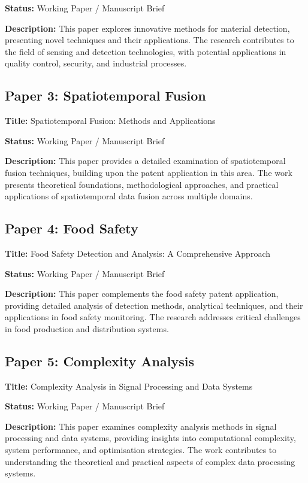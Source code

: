 \documentclass[12pt,a4paper]{article}
\begin{document}
\textbf{Status:} Working Paper / Manuscript Brief

\textbf{Description:} This paper explores innovative methods for material detection, presenting novel techniques and their applications. The research contributes to the field of sensing and detection technologies, with potential applications in quality control, security, and industrial processes.

\subsection{Paper 3: Spatiotemporal Fusion}

\textbf{Title:} Spatiotemporal Fusion: Methods and Applications

\textbf{Status:} Working Paper / Manuscript Brief

\textbf{Description:} This paper provides a detailed examination of spatiotemporal fusion techniques, building upon the patent application in this area. The work presents theoretical foundations, methodological approaches, and practical applications of spatiotemporal data fusion across multiple domains.

\subsection{Paper 4: Food Safety}

\textbf{Title:} Food Safety Detection and Analysis: A Comprehensive Approach

\textbf{Status:} Working Paper / Manuscript Brief

\textbf{Description:} This paper complements the food safety patent application, providing detailed analysis of detection methods, analytical techniques, and their applications in food safety monitoring. The research addresses critical challenges in food production and distribution systems.

\subsection{Paper 5: Complexity Analysis}

\textbf{Title:} Complexity Analysis in Signal Processing and Data Systems

\textbf{Status:} Working Paper / Manuscript Brief

\textbf{Description:} This paper examines complexity analysis methods in signal processing and data systems, providing insights into computational complexity, system performance, and optimisation strategies. The work contributes to understanding the theoretical and practical aspects of complex data processing systems.
\end{document}
